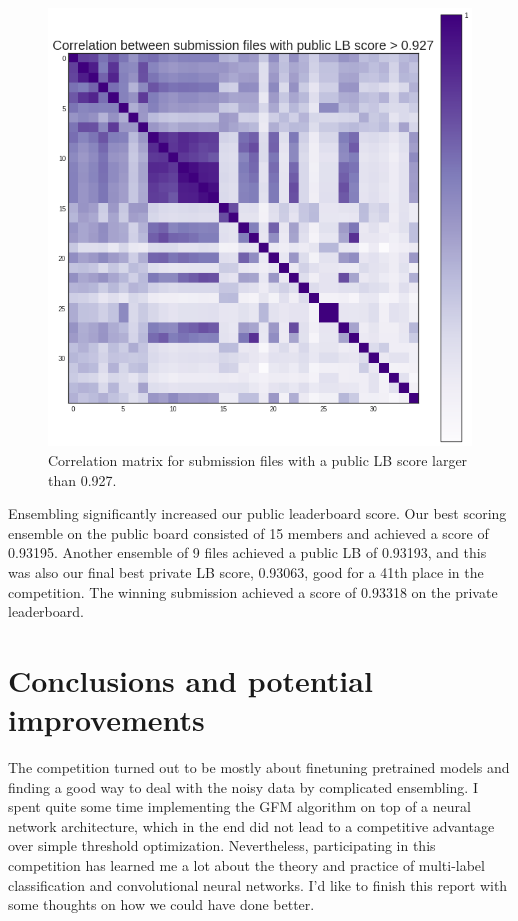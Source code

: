 \documentclass[fleqn]{homework}
\begin{document}
\begin{figure}[H]
	\centering
     \includegraphics[width=0.7\linewidth]{figures/correlations.png}
	\caption{Correlation matrix for submission files with a public LB score larger than 0.927.}
	\label{correlations} 
\end{figure}

Ensembling significantly increased our public leaderboard score. Our best scoring ensemble on the public board consisted of 15 members and achieved a score of 0.93195. Another ensemble of 9 files achieved a public LB of 0.93193, and this was also our final best private LB score, 0.93063, good for a 41th place in the competition. The winning submission achieved a score of 0.93318 on the private leaderboard.

\section{Conclusions and potential improvements}

The competition turned out to be mostly about finetuning pretrained models and finding a good way to deal with the noisy data by complicated ensembling. I spent quite some time implementing the GFM algorithm on top of a neural network architecture, which in the end did not lead to a competitive advantage over simple threshold optimization. Nevertheless, participating in this competition has learned me a lot about the theory and practice of multi-label classification and convolutional neural networks. I'd like to finish this report with some thoughts on how we could have done better. 
\end{document}
